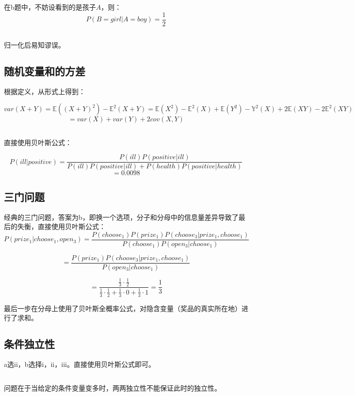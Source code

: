 \documentclass[UTF8]{ctexart}
\begin{document}
在b题中，不妨设看到的是孩子$A$，则：
$$P(B=girl|A=boy)=\frac{1}{2}$$

\subsection{}
归一化后易知谬误。

\subsection{随机变量和的方差}
根据定义，从形式上得到：

$$var(X+Y)=\mathbb{E}((X+Y)^{2})-\mathbb{E}^{2}(X+Y)=\mathbb{E}(X^{2})-\mathbb{E}^{2}(X)+\mathbb{E}(Y^{2})-\mathbb{Y}^{2}(X)+2\mathbb{E}(XY)-2\mathbb{E}^{2}(XY)$$
$$=var(X)+var(Y)+2cov(X,Y)$$


\subsection{}
直接使用贝叶斯公式：

$$P(ill|positive)=\frac{P(ill)P(positive|ill)}{P(ill)P(positive|ill)+P(health)P(positive|health)}$$
$$=0.0098$$

\subsection{三门问题}
经典的三门问题，答案为b，即换一个选项，分子和分母中的信息量差异导致了最后的失衡，直接使用贝叶斯公式：
$$P(prize_{1}|choose_{1},open_{3})=\frac{P(choose_{1})P(prize_{1})P(choose_{3}|prize_{1},choose_{1})}{P(choose_{1})P(open_{3}|choose_{1})}$$

$$=\frac{P(prize_{1})P(choose_{3}|prize_{1},choose_{1})}{P(open_{3}|choose_{1})}$$

$$=\frac{\frac{1}{3}\cdot\frac{1}{2}}{\frac{1}{3}\cdot \frac{1}{2} + \frac{1}{3}\cdot 0 + \frac{1}{3} \cdot 1}=\frac{1}{3}$$

最后一步在分母上使用了贝叶斯全概率公式，对隐含变量（奖品的真实所在地）进行了求和。

\subsection{条件独立性}
a选ii，b选择i，ii，iii。直接使用贝叶斯公式即可。

\subsection{}
问题在于当给定的条件变量变多时，两两独立性不能保证此时的独立性。
\end{document}
